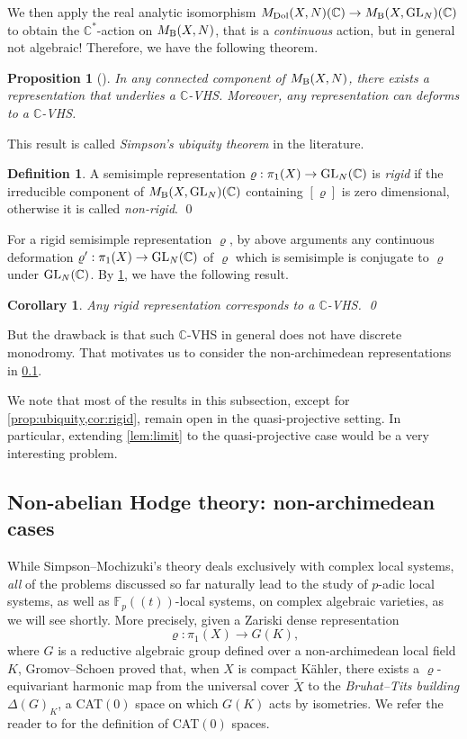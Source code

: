 \documentclass[english]{amsproc}
\theoremstyle{plain}
\newtheorem{proposition}[thm]{Proposition}
\newtheorem{cor}[thm]{Corollary}
\theoremstyle{definition}
\newtheorem{dfn}[thm]{Definition}
\theoremstyle{remark}
\theoremstyle{plain}
\numberwithin{equation}{thm} %
\newcommand{\bC}{\mathbb{C}}
\newcommand{\GL}{{\rm GL}}
\begin{document}
We then apply the real analytic isomorphism $M_{\rm Dol}(X,N)(\bC)\to M_{\rm B}(X,\GL_N)(\bC)$ to obtain  the $\bC^*$-action on $M_{\rm B}(X,N)$, that is a \emph{continuous} action, but in general not algebraic!  
Therefore, we have the following theorem.
\begin{proposition}[\cite{Sim91}]\label{prop:ubiquity}
	In any connected component of $M_{\rm B}(X,N)$,  there exists a representation that underlies a $\bC$-VHS. Moreover, any representation can deforms to a $\bC$-VHS. 
\end{proposition}
This result is called \emph{Simpson's ubiquity theorem} in the literature.   


\begin{dfn}
	A semisimple representation   
	$\varrho:\pi_1(X)\to \GL_N(\bC)$  is   \emph{rigid} if  the irreducible component  of $M_{\rm B}(X,\GL_{N})(\bC)$ containing $[\varrho]$  is zero dimensional,  otherwise it is called \emph{non-rigid}.   \qed
\end{dfn}
For a  rigid semisimple  representation $\varrho$, by  above arguments any continuous deformation $\varrho':\pi_1(X)\to \GL_N(\bC)$ of $\varrho$ which is semisimple is conjugate to $\varrho$  under $\GL_N(\bC)$. By \cref{prop:ubiquity}, we have the following result.
\begin{cor}\label{cor:rigid}
	Any rigid representation corresponds to a $\bC$-VHS. \qed
\end{cor} 
But the drawback is that such $\bC$-VHS in general does not have discrete monodromy. That motivates us to consider the non-archimedean representations in \cref{sec:na}.  

We note that most of the results in this subsection, except for 
\cref{prop:ubiquity,cor:rigid}, remain open in the quasi-projective setting. 
In particular, extending \cref{lem:limit} to the quasi-projective case would be a 
very interesting problem. 
\subsection{Non-abelian Hodge theory: non-archimedean cases}\label{sec:na}
While Simpson--Mochizuki's theory deals exclusively with complex local systems, 
\emph{all} of the problems discussed so far naturally lead to the study of 
$p$-adic local systems, as well as $\mathbb{F}_p((t))$-local systems, on 
complex algebraic varieties, as we will see shortly.  More precisely, given a Zariski dense representation
\[
\varrho \colon \pi_1(X) \longrightarrow G(K),
\]
where $G$ is a reductive algebraic group defined over a non-archimedean local field $K$, Gromov--Schoen \cite{GS92} proved that, when $X$ is compact Kähler, there exists a $\varrho$-equivariant harmonic map from the universal cover $\widetilde{X}$ to the \emph{Bruhat--Tits building} $\Delta(G)_K$, a CAT$(0)$ space on which $G(K)$ acts by isometries. We refer the reader to \cite{BH99} for the definition of CAT$(0)$ spaces.
\end{document}
